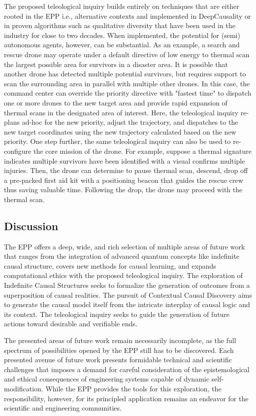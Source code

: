 The proposed teleological inquiry builds entirely on techniques that are either rooted in the EPP i.e., alternative contexts and implemented in DeepCausality or in proven algorithms such as qualitative diversity that have been used in the industry for close to two decades. When implemented, the potential for (semi) autonomous agents, however, can be substantial. As an example, a search and rescue drone may operate under a default directive of low energy to thermal scan the largest possible area for survivors in a disaster area. It is possible that another drone has detected multiple potential survivors, but requires support to scan the surrounding area in parallel with multiple other drones. In this case, the command center can override the priority directive with "fastest time" to dispatch one or more drones to the new target area and provide rapid expansion of thermal scans in the designated area of interest. Here, the teleological inquiry re-plans ad-hoc for the new priority, adjust the trajectory, and dispatches to the new target coordinates using the new trajectory calculated based on the new priority. One step further, the same teleological inquiry can also be used to re-configure the core mission of the drone. For example, suppose a thermal signature indicates multiple survivors have been identified with a visual confirms multiple injuries. Then, the drone can determine to pause thermal scan, descend, drop off a pre-packed first aid kit with a positioning beacon that guides the rescue crew thus saving valuable time. Following the drop, the drone may proceed with the thermal scan.  
  
  \subsection{Discussion}

The EPP offers a deep, wide, and rich selection of multiple areas of future work that ranges from the integration of advanced quantum concepts like indefinite causal structure, covers new methods for causal learning, and expands  computational ethics with the proposed teleological inquiry. The exploration of Indefinite Causal Structures seeks to formalize the generation of outcomes from a superposition of causal realities. The pursuit of Contextual Causal Discovery aims to generate the causal model itself from the intricate interplay of causal logic and its context. The teleological inquiry seeks to guide the generation of future actions toward desirable and verifiable ends. 

The presented areas of future work remain necessarily incomplete, as the full spectrum of possibilities opened by the EPP still has to be discovered. Each presented avenue of future work presents formidable technical and scientific challenges that imposes a demand for careful consideration of the epistemological and ethical consequences of engineering systems capable of dynamic self-modification. While the EPP provides the tools for this exploration, the responsibility, however, for its principled application remains an endeavor for the scientific and engineering communities.


\newpage

